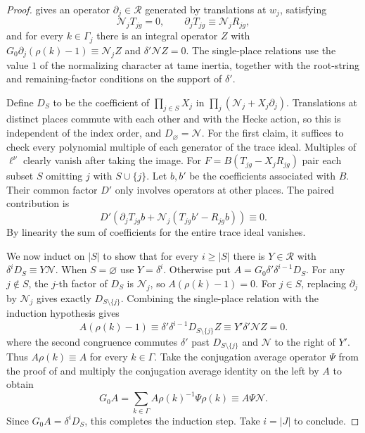 \begin{proof}
 gives an operator $\partial_j\in\mathcal R$ generated by translations at $w_j$, satisfying
\[
 \mathcal N_jT_{jg}=0,\qquad
 \partial_jT_{jg}\equiv\mathcal N_jR_{jg},
\]
and for every $k\in\Gamma_j$ there is an integral operator $Z$ with $G_0\partial_j(\rho(k)-1)\equiv\mathcal N_j Z$ and $\delta'\mathcal N Z=0$.
The single-place relations use the value $1$ of the normalizing character at tame inertia, together with the root-string and remaining-factor conditions on the support of $\delta'$.

Define $D_S$ to be the coefficient of $\prod_{j\in S}X_j$ in $\prod_j(\mathcal N_j+X_j\partial_j)$.
Translations at distinct places commute with each other and with the Hecke action, so this is independent of the index order, and $D_\varnothing=\mathcal N$.
For the first claim, it suffices to check every polynomial multiple of each generator of the trace ideal.
Multiples of $\ell^\nu$ clearly vanish after taking the image.
For $F=B(T_{jg}-X_jR_{jg})$ pair each subset $S$ omitting $j$ with $S\cup\{j\}$. Let $b,b'$ be the coefficients associated with $B$. Their common factor $D'$ only involves operators at other places. The paired contribution is
\[
 D'\left(\partial_j T_{jg}b
        +\mathcal N_j(T_{jg}b'-R_{jg}b)\right)\equiv 0.
\]
By linearity the sum of coefficients for the entire trace ideal vanishes.

We now induct on $|S|$ to show that for every $i\ge |S|$ there is $Y\in\mathcal R$ with $\delta^iD_S\equiv Y\mathcal N$.
When $S=\varnothing$ use $Y=\delta^i$.
Otherwise put $A=G_0\delta'\delta^{i-1}D_S$.
For any $j\notin S$, the $j$-th factor of $D_S$ is $\mathcal N_j$, so $A(\rho(k)-1)=0$. For $j\in S$, replacing $\partial_j$ by $\mathcal N_j$ gives exactly $D_{S\setminus\{j\}}$.
Combining the single-place relation with the induction hypothesis gives
\[
 A(\rho(k)-1)
 \equiv\delta'\delta^{i-1}D_{S\setminus\{j\}}Z
 \equiv Y'\delta'\mathcal N Z=0 .
\]
where the second congruence commutes $\delta'$ past $D_{S\setminus\{j\}}$ and $\mathcal N$ to the right of $Y'$.
Thus $A\rho(k)\equiv A$ for every $k\in\Gamma$.
Take the conjugation average operator $\Psi$ from the proof of  and multiply the conjugation average identity on the left by $A$ to obtain
\[
 G_0 A=\sum_{k\in\Gamma}A\rho(k)^{-1}\Psi\rho(k)
       \equiv A\Psi\mathcal N.
\]
Since $G_0 A=\delta^iD_S$, this completes the induction step. Take $i=|J|$ to conclude.
\end{proof}

